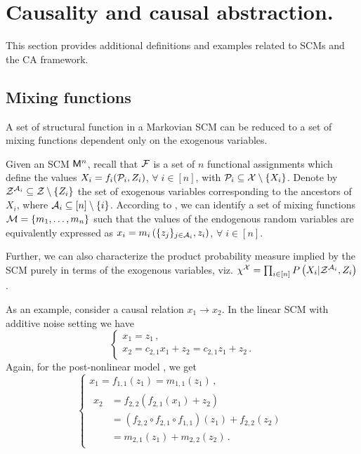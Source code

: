 
\section{Causality and causal abstraction.}\label{app:CA}
This section provides additional definitions and examples related to SCMs and the CA framework.

\subsection{Mixing functions}
A set of structural function in a Markovian SCM can be reduced to a set of mixing functions dependent only on the exogenous variables. 

Given an SCM $\mathsf{M}^n$, recall that $\mathcal{F}$ is a set of $n$ functional assignments which define the values $X_i=f_i(\mathcal{P}_i, Z_i)$, $\forall \; i \in [n]$, with $ \mathcal{P}_i \subseteq \mathcal{X} \setminus \{ X_i\}$. 
Denote by $\mathcal{Z}^{\mathcal{A}_i} \subseteq \mathcal{Z} \setminus \{ Z_i\}$ the set of exogenous variables corresponding to the ancestors of $X_i$, where $\mathcal{A}_i \subseteq [n] \setminus \{i\}$.
According to \myfunctional, we can identify a set of mixing functions $\mathcal{M}=\{m_1, \ldots, m_n\}$ such that the values of the endogenous random variables are equivalently expressed as $x_i=m_i\left(\{z_j\}_{j\in \mathcal{A}_i}, z_i\right)$, $\forall \; i \in [n]$. 

Further, we can also characterize the product probability measure implied by the SCM purely in terms of the exogenous variables, viz. $\chi^\mathcal{X}=\prod_{i \in [n]} P\left(X_i | \mathcal{Z}^{\mathcal{A}_i}, Z_i\right)$. 

As an example, consider a causal relation $x_1 \rightarrow x_2$.
In the linear SCM with additive noise  setting we have
\begin{equation}
    \begin{cases}
        x_1=z_1\,,\\
        x_2=c_{2,1} x_1 + z_2 = c_{2,1} z_1 + z_2\,.          
    \end{cases}
\end{equation}
Again, for the post-nonlinear model , we get
\begin{equation}
    \begin{cases}
        x_1=f_{1,1}(z_1)=m_{1,1}(z_1)\,,\\
        \begin{aligned}
            x_2&=f_{2,2}(f_{2,1}(x_1) + z_2)\\ 
            &= (f_{2,2}\circ f_{2,1} \circ f_{1,1})(z_1) + f_{2,2}(z_2)\\
            &= m_{2,1}(z_1) + m_{2,2}(z_2)\,. 
        \end{aligned}    
    \end{cases}
\end{equation}

